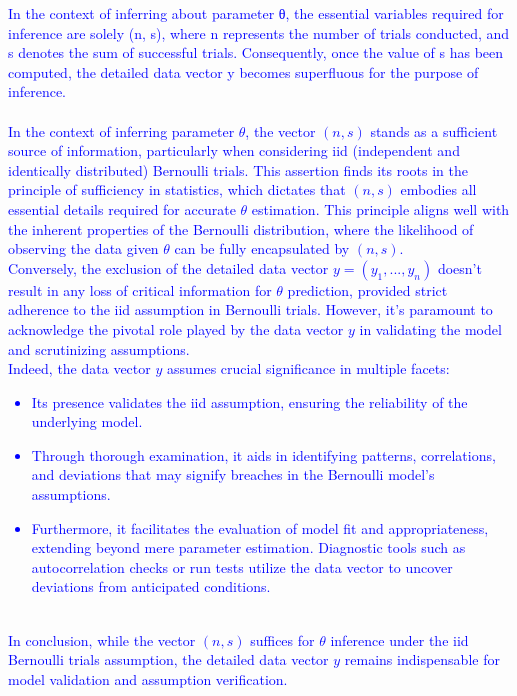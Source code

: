 \documentclass[12pt]{article}
\begin{document}
\begin{itemize}
\textcolor{blue}{
In the context of inferring about parameter θ, the essential variables required for inference are solely (n, s), where n represents the number of trials conducted, and s denotes the sum of successful trials. Consequently, once the value of s has been computed, the detailed data vector y becomes superfluous for the purpose of inference.\\ \\
In the context of inferring parameter $\theta$, the vector $(n, s)$ stands as a sufficient source of information, particularly when considering iid (independent and identically distributed) Bernoulli trials. This assertion finds its roots in the principle of sufficiency in statistics, which dictates that $(n, s)$ embodies all essential details required for accurate $\theta$ estimation. This principle aligns well with the inherent properties of the Bernoulli distribution, where the likelihood of observing the data given $\theta$ can be fully encapsulated by $(n, s)$.
\\
Conversely, the exclusion of the detailed data vector $y = (y_1, ..., y_n)$ doesn't result in any loss of critical information for $\theta$ prediction, provided strict adherence to the iid assumption in Bernoulli trials. However, it's paramount to acknowledge the pivotal role played by the data vector $y$ in validating the model and scrutinizing assumptions.
\\
Indeed, the data vector $y$ assumes crucial significance in multiple facets:
\begin{itemize}[label=-]
    \item Its presence validates the iid assumption, ensuring the reliability of the underlying model.
    \item Through thorough examination, it aids in identifying patterns, correlations, and deviations that may signify breaches in the Bernoulli model's assumptions.
    \item Furthermore, it facilitates the evaluation of model fit and appropriateness, extending beyond mere parameter estimation. Diagnostic tools such as autocorrelation checks or run tests utilize the data vector to uncover deviations from anticipated conditions.
\end{itemize}
\\
In conclusion, while the vector $(n, s)$ suffices for $\theta$ inference under the iid Bernoulli trials assumption, the detailed data vector $y$ remains indispensable for model validation and assumption verification.
}


\end{itemize}
\end{document}

